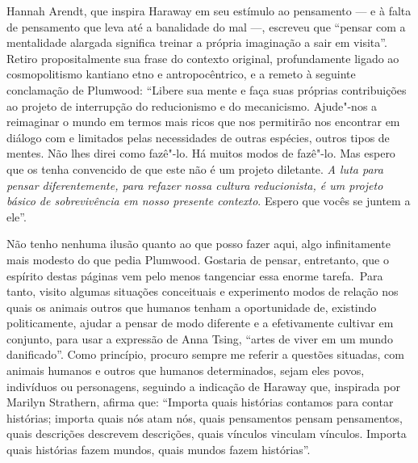 \begin{multicols}{2}
\vspace{\baselineskip}

{\small{}}

\vspace{\baselineskip}

Hannah Arendt, que inspira Haraway em seu estímulo ao pensamento --- e à
falta de pensamento que leva até a banalidade do mal ---, escreveu que
``pensar com a mentalidade alargada significa treinar a própria
imaginação a sair em visita''. Retiro propositalmente sua frase do contexto
original, profundamente ligado ao cosmopolitismo kantiano etno e
antropocêntrico, e a remeto à seguinte conclamação de Plumwood:
``Libere sua mente e faça suas próprias contribuições ao projeto de
interrupção do reducionismo e do mecanicismo. Ajude"-nos a reimaginar o
mundo em termos mais ricos que nos permitirão nos encontrar em diálogo
com e limitados pelas necessidades de outras espécies, outros tipos de
mentes. Não lhes direi como fazê"-lo. Há muitos modos de fazê"-lo. Mas
espero que os tenha convencido de que este não é um projeto diletante.
\emph{A luta para pensar diferentemente, para refazer nossa cultura
reducionista, é um projeto básico de sobrevivência em nosso presente
contexto}. Espero que vocês se juntem a ele''.

Não tenho nenhuma ilusão quanto ao que posso fazer aqui, algo
infinitamente mais modesto do que pedia Plumwood. Gostaria de pensar,
entretanto, que o espírito destas páginas vem pelo menos tangenciar essa
enorme tarefa.~Para tanto, visito algumas situações conceituais e
experimento modos de relação nos quais os animais outros que humanos
tenham a oportunidade de, existindo politicamente, ajudar a pensar de
modo diferente e a efetivamente cultivar em conjunto, para usar a
expressão de Anna Tsing, ``artes de viver em um mundo danificado''. Como
princípio, procuro sempre me referir a questões situadas, com animais
humanos e outros que humanos determinados, sejam eles povos, indivíduos
ou personagens, seguindo a indicação de Haraway que, inspirada por
Marilyn Strathern, afirma que: 
``Importa quais histórias contamos para contar histórias; importa quais
nós atam nós, quais pensamentos pensam pensamentos, quais descrições
descrevem descrições, quais vínculos vinculam vínculos. Importa quais
histórias fazem mundos, quais mundos fazem histórias''.


\end{multicols}
